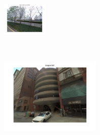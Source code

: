 \begin{minipage}{0.75\linewidth}
\begin{minipage}{\linewidth}
                \colorbox{myRed}{\includegraphics[trim = 35mm 30mm 35mm 30mm, clip=true, height=16mm]{imgs/Pval/exImproved03/improved04.jpg}}
            \end{minipage} 
        \end{minipage}
        \vspace{3mm}
        \\
        \begin{minipage}{0.34\linewidth}
            \centering
            \vspace{0mm}
            \includegraphics[trim = 45mm 40mm 45mm 30mm, clip=true, height=36mm]{imgs/Pval/exImproved04/query.jpg}
        \end{minipage}
